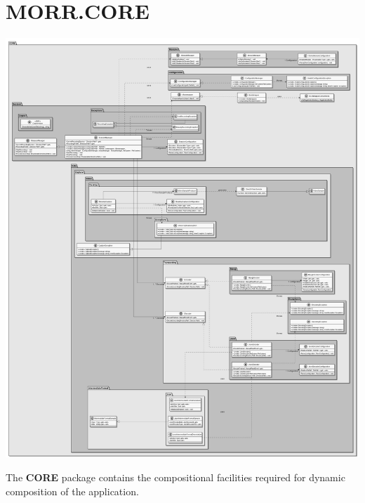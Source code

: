 \newpage
\section{MORR.CORE}

\begin{center}
    \includegraphics[width=1.0\textwidth]{resources/Packages/CORE.png}
\end{center}

The \textbf{CORE} package contains the compositional facilities required for dynamic composition of the application.

\begin{packif}
\end{packif}

\begin{packclass}
\end{packclass}

\begin{packpack}
\end{packpack}


